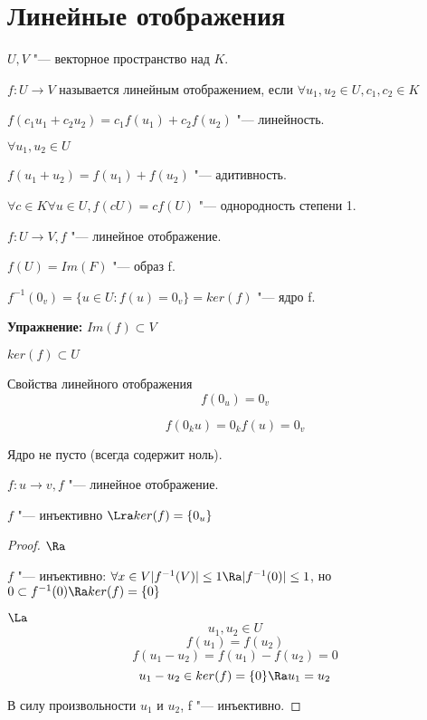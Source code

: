 ﻿\section{Линейные отображения}
\begin{Def}
$U, V$ "--- векторное пространство над $K$.

$f\colon U \to V$ называется линейным отображением, если $\forall u_1, u_2 \in U, c_1, c_2 \in K$

$f(c_1u_1 + c_2u_2) = c_1f(u_1) + c_2f(u_2)$ "--- линейность.
\end{Def}
\begin{Rem}
$\forall u_1, u_2 \in U$

$f(u_1 + u_2) = f(u_1) + f(u_2)$ "--- адитивность. 

$\forall c \in K \forall u \in U, f(cU) = cf(U)$ "--- однородность степени 1.
\end{Rem}

\begin{Def}
$f \colon U \to V, f$ "--- линейное отображение. 

$f(U) = Im(F)$ "--- образ f.

$f^{-1}(0_v) = \{u \in U\colon f(u) = 0_v\} = ker(f)$ "--- ядро f.
\end{Def}

\textbf{Упражнение:} 
$Im(f) \subset V$

$ker(f) \subset U$

\begin{conseq}{Свойства линейного отображения}
$$f(0_u) = 0_v$$

$$f(0_k u) = 0_kf(u) = 0_v$$

Ядро не пусто (всегда содержит ноль).
\end{conseq}

\begin{lemma}
$f\colon u \to v, f$ "--- линейное отображение.

$f$ "--- инъективно $\Lra ker(f) = \{0_u\}$ 
\end{lemma}

\begin{proof}

$\Ra$

$f$ "--- инъективно: $\forall x \in V |f^{-1}(V)| \le 1 \Ra 
|f^{-1}(0)| \le 1$, но $0 \subset f^{-1}(0) \Ra ker(f) = \{0\}$

$\La$
$$u_1, u_2 \in U$$
$$f(u_1) = f(u_2)$$
$$f(u_1 - u_2) = f(u_1) - f(u_2) = 0 $$
$$u_1 - u_2 \in ker(f) = \{0\} \Ra u_1 = u_2$$

В силу произвольности $u_1$ и $u_2$, f "--- инъективно. 
\end{proof}

